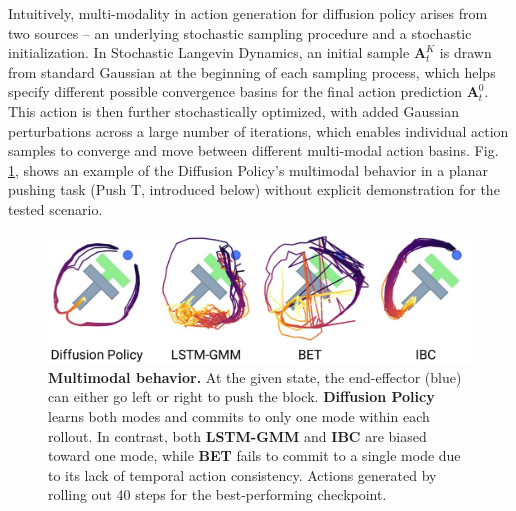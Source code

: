 Intuitively, multi-modality in action generation for diffusion policy arises from two sources -- an underlying stochastic sampling procedure and a stochastic initialization. In Stochastic Langevin Dynamics, an initial sample $\mathbf{A}^K_t$ is drawn from standard Gaussian at the beginning of each sampling process, which helps specify different possible convergence basins for the final action prediction $\mathbf{A}^0_t$. This action is then further stochastically optimized, with added Gaussian perturbations across a large number of iterations, which enables individual action samples to converge and move between different multi-modal action basins.
Fig. \ref{fig:multimodal}, shows an example of the Diffusion Policy's multimodal behavior in a planar pushing task (Push T, introduced below) without explicit demonstration for the tested scenario. 

\begin{figure}[h]
\centering
\includegraphics[width=0.98\linewidth]{figure/multimodal_sim.pdf} %

\caption{\label{fig:multimodal} 
\textbf{Multimodal behavior.} At the given state, the end-effector (blue) can either go left or right to push the block.
\textbf{Diffusion Policy} learns both modes and commits to only one mode within each rollout.  
In contrast, both \textbf{LSTM-GMM} \cite{robomimic} and \textbf{IBC} \cite{ibc} are biased toward one mode, while \textbf{BET} \cite{bet} fails to commit to a single mode due to its lack of temporal action consistency. 
Actions generated by rolling out 40 steps for the best-performing checkpoint. 
}
\vspace{-2mm}
\end{figure}

